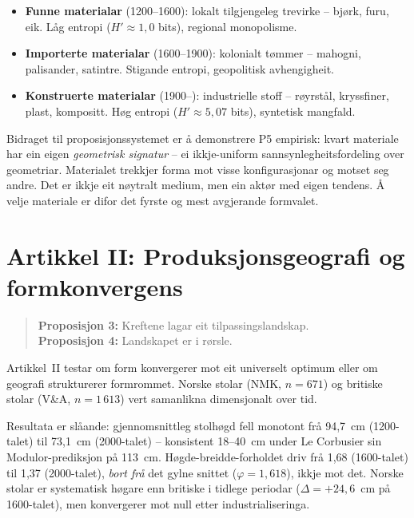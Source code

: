 \documentclass[12pt,a4paper,oneside]{report}
\begin{document}
\begin{itemize}
  \item \textbf{Funne materialar} (1200--1600): lokalt tilgjengeleg trevirke -- bjørk, furu, eik. Låg entropi ($H' \approx 1{,}0$ bits), regional monopolisme.
  \item \textbf{Importerte materialar} (1600--1900): kolonialt tømmer -- mahogni, palisander, satintre. Stigande entropi, geopolitisk avhengigheit.
  \item \textbf{Konstruerte materialar} (1900--): industrielle stoff -- røyrstål, kryssfiner, plast, kompositt. Høg entropi ($H' \approx 5{,}07$ bits), syntetisk mangfald.
\end{itemize}

Bidraget til proposisjonssystemet er å demonstrere P5 empirisk: kvart materiale har ein eigen \emph{geometrisk signatur} -- ei ikkje-uniform sannsynlegheitsfordeling over geometriar. Materialet trekkjer forma mot visse konfigurasjonar og motset seg andre. Det er ikkje eit nøytralt medium, men ein aktør med eigen tendens. Å velje materiale er difor det fyrste og mest avgjerande formvalet.

\section{Artikkel II: Produksjonsgeografi og formkonvergens}
\label{sec:art2}

\begin{quote}
\textbf{Proposisjon 3:} Kreftene lagar eit tilpassingslandskap.\\
\textbf{Proposisjon 4:} Landskapet er i rørsle.
\end{quote}

Artikkel~II testar om form konvergerer mot eit universelt optimum eller om geografi strukturerer formrommet. Norske stolar (NMK, $n = 671$) og britiske stolar (V\&A, $n = 1\,613$) vert samanlikna dimensjonalt over tid.

Resultata er slåande: gjennomsnittleg stolhøgd fell monotont frå 94,7~cm (1200-talet) til 73,1~cm (2000-talet) -- konsistent 18--40~cm under Le Corbusier sin Modulor-prediksjon på 113~cm. Høgde-breidde-forholdet driv frå 1,68 (1600-talet) til 1,37 (2000-talet), \emph{bort frå} det gylne snittet ($\varphi = 1{,}618$), ikkje mot det. Norske stolar er systematisk høgare enn britiske i tidlege periodar ($\Delta = +24{,}6$~cm på 1600-talet), men konvergerer mot null etter industrialiseringa.
\end{document}
